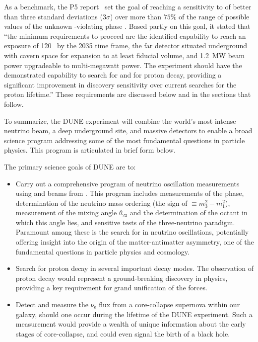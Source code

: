 As a benchmark, the P5 report~\cite{p5report} set the goal of
reaching a sensitivity to  of better than three
standard deviations (\num{3}$\sigma$) over more than $75\%$
of the range of possible values of the unknown
-violating phase \deltacp.
Based partly on this goal, it stated that ``the
minimum requirements to proceed are the identified capability
to reach an exposure of \num{120}~\ktMWyr{} by the 2035 time
frame, the far detector situated underground with cavern space
for expansion to at least \fdfiducialmass \lar fiducial volume,
and \SI{1.2}{MW} beam power upgradeable to multi-megawatt power.
The experiment should have the demonstrated capability to
search for  and for proton decay, providing a
significant improvement in discovery sensitivity over current
searches for the proton lifetime.''
These requirements are discussed below and in the sections
that follow.

To summarize, the DUNE experiment will combine the world's most
intense neutrino beam, a deep underground site, and massive \lar
detectors to enable a broad science program addressing some of
the most fundamental questions in particle physics.
This program is articulated in brief form below.

The primary science goals of DUNE are to:
\begin{itemize}

\item Carry out a comprehensive program of neutrino oscillation measurements using
      \numu and \anumu beams from \fnal. This program includes measurements of
      the  phase, determination of the neutrino mass ordering
      (the sign of $ \equiv m_3^2-m_1^2$), measurement of the mixing
      angle $\theta_{23}$ and the determination of the octant in which this
      angle lies, and sensitive tests of the three-neutrino paradigm.
      Paramount among these is the search for  in neutrino oscillations, potentially offering 
      insight into the origin of the matter-antimatter asymmetry,
      one of the fundamental questions in particle physics and cosmology.

\item Search for proton decay in several important decay modes.
      The observation of proton decay would represent a ground-breaking discovery
      in physics, providing a key requirement for grand unification of the forces.

\item Detect and measure the $\nu_\text{e}$ flux from a core-collapse
      supernova within our galaxy, should one occur during the lifetime
      of the DUNE experiment. Such a measurement would provide a wealth
      of unique information about the early stages of core-collapse, and
      could even signal the birth of a black hole.

\end{itemize}

